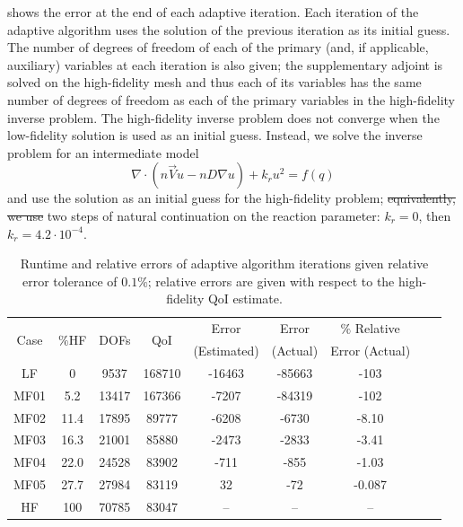 \documentclass[review,sort&compress]{elsarticle}
\providecommand{\DIFaddtex}[1]{{\protect\color{blue}\uwave{#1}}} %
\providecommand{\DIFdeltex}[1]{{\protect\color{red}\sout{#1}}}                      %
\providecommand{\DIFaddbegin}{} %
\providecommand{\DIFaddend}{} %
\providecommand{\DIFdelbegin}{} %
\providecommand{\DIFdelend}{} %
\providecommand{\DIFaddbeginFL}{} %
\providecommand{\DIFaddendFL}{} %
\providecommand{\DIFdelbeginFL}{} %
\providecommand{\DIFdelendFL}{} %
\providecommand{\DIFadd}[1]{\texorpdfstring{\DIFaddtex{#1}}{#1}} %
\providecommand{\DIFdel}[1]{\texorpdfstring{\DIFdeltex{#1}}{}} %
\newcommand{\DIFscaledelfig}{0.5}
\newlength{\DIFdelgraphicswidth} %
\newlength{\DIFdelgraphicsheight} %
\newcommand{\DIFaddincludegraphics}[2][]{{\color{blue}\fbox{\DIFOincludegraphics[#1]{#2}}}} %
\newcommand{\DIFdelincludegraphics}[2][]{%
\sbox{\DIFdelgraphicsbox}{\DIFOincludegraphics[#1]{#2}}%
\settoboxwidth{\DIFdelgraphicswidth}{\DIFdelgraphicsbox} %
\settoboxtotalheight{\DIFdelgraphicsheight}{\DIFdelgraphicsbox} %
\scalebox{\DIFscaledelfig}{%
\parbox[b]{\DIFdelgraphicswidth}{\usebox{\DIFdelgraphicsbox}\\[-\baselineskip] \rule{\DIFdelgraphicswidth}{0em}}\llap{\resizebox{\DIFdelgraphicswidth}{\DIFdelgraphicsheight}{%
\setlength{\unitlength}{\DIFdelgraphicswidth}%
\begin{picture}(1,1)%
\thicklines\linethickness{2pt} %
{\color[rgb]{1,0,0}\put(0,0){\framebox(1,1){}}}%
{\color[rgb]{1,0,0}\put(0,0){\line( 1,1){1}}}%
{\color[rgb]{1,0,0}\put(0,1){\line(1,-1){1}}}%
\end{picture}%
}\hspace*{3pt}}} %
} %
\DeclareRobustCommand{\DIFaddbegin}{\DIFOaddbegin \let\includegraphics\DIFaddincludegraphics} %
\DeclareRobustCommand{\DIFaddend}{\DIFOaddend \let\includegraphics\DIFOincludegraphics} %
\DeclareRobustCommand{\DIFdelbegin}{\DIFOdelbegin \let\includegraphics\DIFdelincludegraphics} %
\DeclareRobustCommand{\DIFdelend}{\DIFOaddend \let\includegraphics\DIFOincludegraphics} %
\DeclareRobustCommand{\DIFaddbeginFL}{\DIFOaddbeginFL \let\includegraphics\DIFaddincludegraphics} %
\DeclareRobustCommand{\DIFaddendFL}{\DIFOaddendFL \let\includegraphics\DIFOincludegraphics} %
\DeclareRobustCommand{\DIFdelbeginFL}{\DIFOdelbeginFL \let\includegraphics\DIFdelincludegraphics} %
\DeclareRobustCommand{\DIFdelendFL}{\DIFOaddendFL \let\includegraphics\DIFOincludegraphics} %
\begin{document}
 shows the error at the end of each adaptive iteration. Each iteration of the adaptive algorithm uses the solution of the previous iteration as its initial guess. The number of degrees of freedom of each of the primary (and, if applicable, auxiliary) variables at each iteration is also given; the supplementary adjoint is solved on the high-fidelity mesh and thus each of its variables has the same number of degrees of freedom as each of the primary variables in the high-fidelity inverse problem. The high-fidelity inverse problem does not converge when the low-fidelity solution is used as an initial guess. Instead, we solve the inverse problem for an intermediate model
%
\begin{equation}
\nabla\cdot(n\vec{V}u - nD\nabla u) + k_ru^2 = f(q)
\end{equation}
%
\DIFaddbegin \DIFadd{with $k_r=0$, }\DIFaddend and use the solution as an initial guess for the high-fidelity problem; \DIFdelbegin \DIFdel{equivalently, we use }\DIFdelend \DIFaddbegin \DIFadd{this is equivalent to using }\DIFaddend two steps of natural continuation on the reaction parameter: $k_r=0$, then $k_r=4.2\cdot10^{-4}$.
%
\begin{table}[htbp]
\DIFdelbeginFL %
\DIFdelendFL \centering
\begin{tabular}{|c|c|c|c|c|c|c|c|c|}
\hline
\multirow{2}{*}{Case} & \multirow{2}{*}{$\%$HF} & \multirow{2}{*}{DOFs} & \multirow{2}{*}{QoI} & Error & Error & $\%$ Relative \\
& & & & (Estimated) & (Actual) & Error (Actual)  \\ \hline
LF   & 0    & 9537  & 168710 & -16463 & -85663 & -103    \\
MF01 & 5.2  & 13417 & 167366 & -7207  & -84319 & -102    \\
MF02 & 11.4 & 17895 & 89777  & -6208  & -6730  & -8.10   \\
MF03 & 16.3 & 21001 & 85880  & -2473  & -2833  & -3.41   \\
MF04 & 22.0 & 24528 & 83902  & -711   & -855   & -1.03   \\
MF05 & 27.7 & 27984 & 83119  & 32     & -72    & -0.087  \\
HF   & 100  & 70785 & 83047  & --     & --     & --    \\ \hline
\end{tabular}
\caption{Runtime and relative errors of adaptive algorithm iterations given relative error tolerance of $0.1\%$; relative errors are given with respect to the high-fidelity QoI estimate.}
\DIFaddbeginFL \label{tab:ref3D_diffmesh}
\DIFaddendFL \end{table}
%
\end{document}
